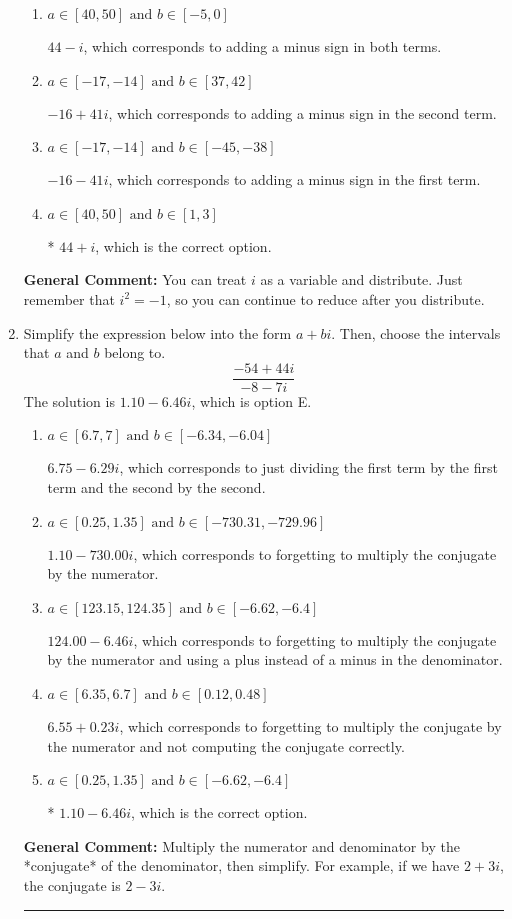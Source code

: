 \documentclass{extbook}[14pt]
\newcommand{\litem}[1]{\item #1

\rule{\textwidth}{0.4pt}}
\begin{document}
\begin{enumerate}
{\begin{enumerate}[label=\Alph*.]
 $14 - 30 i$, which corresponds to just multiplying the real terms to get the real part of the solution and the coefficients in the complex terms to get the complex part.
\item \( a \in [40, 50] \text{ and } b \in [-5, 0] \)

 $44 - i$, which corresponds to adding a minus sign in both terms.
\item \( a \in [-17, -14] \text{ and } b \in [37, 42] \)

 $-16 + 41 i$, which corresponds to adding a minus sign in the second term.
\item \( a \in [-17, -14] \text{ and } b \in [-45, -38] \)

 $-16 - 41 i$, which corresponds to adding a minus sign in the first term.
\item \( a \in [40, 50] \text{ and } b \in [1, 3] \)

* $44 + i$, which is the correct option.
\end{enumerate}

\textbf{General Comment:} You can treat $i$ as a variable and distribute. Just remember that $i^2=-1$, so you can continue to reduce after you distribute.
}
\litem{
Simplify the expression below into the form $a+bi$. Then, choose the intervals that $a$ and $b$ belong to.
\[ \frac{-54 + 44 i}{-8 - 7 i} \]
The solution is \( 1.10  - 6.46 i \), which is option E.\begin{enumerate}[label=\Alph*.]
\item \( a \in [6.7, 7] \text{ and } b \in [-6.34, -6.04] \)

 $6.75  - 6.29 i$, which corresponds to just dividing the first term by the first term and the second by the second.
\item \( a \in [0.25, 1.35] \text{ and } b \in [-730.31, -729.96] \)

 $1.10  - 730.00 i$, which corresponds to forgetting to multiply the conjugate by the numerator.
\item \( a \in [123.15, 124.35] \text{ and } b \in [-6.62, -6.4] \)

 $124.00  - 6.46 i$, which corresponds to forgetting to multiply the conjugate by the numerator and using a plus instead of a minus in the denominator.
\item \( a \in [6.35, 6.7] \text{ and } b \in [0.12, 0.48] \)

 $6.55  + 0.23 i$, which corresponds to forgetting to multiply the conjugate by the numerator and not computing the conjugate correctly.
\item \( a \in [0.25, 1.35] \text{ and } b \in [-6.62, -6.4] \)

* $1.10  - 6.46 i$, which is the correct option.
\end{enumerate}

\textbf{General Comment:} Multiply the numerator and denominator by the *conjugate* of the denominator, then simplify. For example, if we have $2+3i$, the conjugate is $2-3i$.
}
\end{enumerate}
\end{document}
